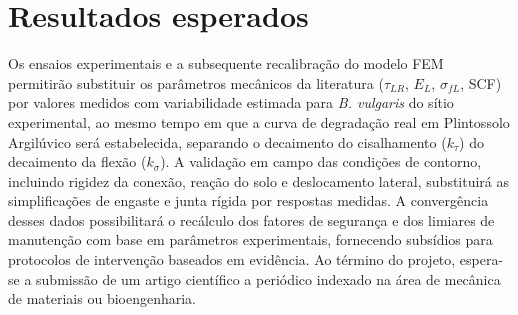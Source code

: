 \documentclass[
  brazilian,
  authoryear,
  preprint]{elsarticle}
\begin{document}
\section{Resultados esperados}\label{resultados-esperados}

Os ensaios experimentais e a subsequente recalibração do modelo FEM
permitirão substituir os parâmetros mecânicos da literatura
(\(\tau_{LR}\), \(E_L\), \(\sigma_{fL}\), SCF) por valores medidos com
variabilidade estimada para \emph{B. vulgaris} do sítio experimental, ao
mesmo tempo em que a curva de degradação real em Plintossolo Argilúvico
será estabelecida, separando o decaimento do cisalhamento (\(k_\tau\))
do decaimento da flexão (\(k_\sigma\)). A validação em campo das
condições de contorno, incluindo rigidez da conexão, reação do solo e
deslocamento lateral, substituirá as simplificações de engaste e junta
rígida por respostas medidas. A convergência desses dados possibilitará
o recálculo dos fatores de segurança e dos limiares de manutenção com
base em parâmetros experimentais, fornecendo subsídios para protocolos
de intervenção baseados em evidência. Ao término do projeto, espera-se a
submissão de um artigo científico a periódico indexado na área de
mecânica de materiais ou bioengenharia.


\renewcommand\refname{Referências}

\end{document}
